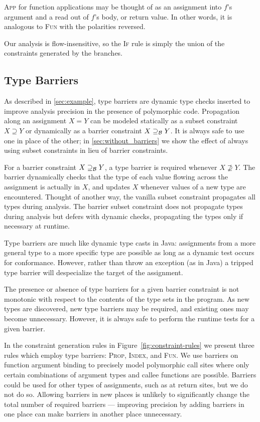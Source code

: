 \textsc{App} for function applications may be thought of as an assignment into
$f$'s argument and a read out of $f$'s body, or return value. In other words,
it is analogous to \textsc{Fun} with the polarities reversed.

Our analysis is flow-insensitive, so the \textsc{If} rule is simply the union
of the constraints generated by the branches.

\subsection{Type Barriers}
\label{sec:analysis-barriers}

As described in \Section\ref{sec:example}, type barriers are dynamic type checks
inserted to improve analysis precision in the presence
of polymorphic code.
Propagation along an assignment $X = Y$ can be modeled
statically as a subset
constraint $X \supseteq Y$ or dynamically as a barrier constraint
$X \supseteq_\mathcal{B} Y$.
It is always safe to use one in place of the other; in \Section\ref{sec:without_barriers}
we show the effect of always using subset constraints in lieu of
barrier constraints.

For a barrier constraint $X \supseteq_\mathcal{B} Y$, a type barrier is required whenever
$X \not\supseteq Y$. The barrier dynamically checks that the type of each value
flowing across the assignment is actually in $X$, and updates $X$ whenever
values of a new type are encountered.
Thought of another way, the vanilla subset constraint propagates
all types during analysis. The barrier subset constraint does not propagate
types during analysis but defers with dynamic checks, propagating the types
only if necessary at runtime.

Type barriers are much like dynamic type casts in Java: assignments from a
more general type to a more specific type are possible as long as a
dynamic test occurs for conformance.
However, rather than throw an exception (as in Java) a tripped type barrier will
despecialize the target of the assignment.

The presence or absence of type barriers for a given barrier constraint is not
monotonic with respect to the contents of the type sets in the program.  As
new types are discovered, new type barriers may be required, and existing ones
may become unnecessary.  However, it is always safe to perform the runtime
tests for a given barrier.

In the constraint generation rules in Figure~\ref{fig:constraint-rules} we
present three rules which employ type barriers:
\textsc{Prop}, \textsc{Index}, and \textsc{Fun}. We use barriers on function
argument binding to precisely model polymorphic call sites where
only certain combinations of argument types and callee functions are possible.
Barriers could be used for other types of assignments, such as at return sites, but we do not do so.
Allowing barriers in new places is unlikely to significantly change the total
number of required barriers --- improving precision by adding barriers in one
place can make barriers in another place unnecessary.

